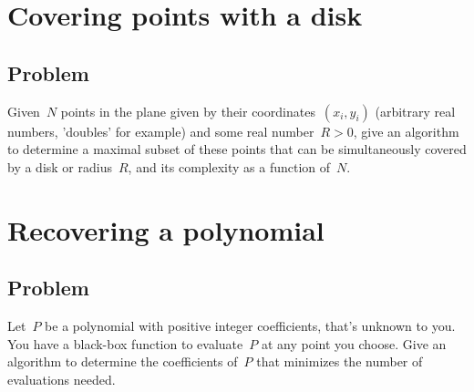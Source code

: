 \documentclass{article}
\begin{document}
\section{Covering points with a disk}

\subsection{Problem}

Given~$N$ points in the plane given by their coordinates~$(x_i, y_i)$ (arbitrary real numbers, 'doubles' for example) and some real number~$R>0$, give an algorithm to determine a maximal subset of these points that can be simultaneously covered by a disk or radius~$R$, and its complexity as a function of~$N$.


\section{Recovering a polynomial}

\subsection{Problem}

Let~$P$ be a polynomial with positive integer coefficients, that's unknown to you. You have a black-box function to evaluate~$P$ at any point you choose. Give an algorithm to determine the coefficients of~$P$ that minimizes the number of evaluations needed.

\end{document}
